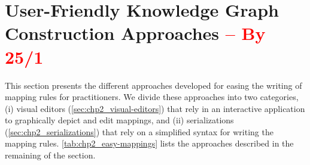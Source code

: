 \section{User-Friendly Knowledge Graph Construction Approaches \textcolor{red}{-- By 25/1}}
\label{sec:chp2_easy_kgc}

This section presents the different approaches developed for easing the writing of mapping rules for practitioners. We divide these approaches into two categories, (i) visual editors (\cref{sec:chp2_visual-editors}) that rely in an interactive application to graphically depict and edit mappings, and (ii) serializations (\cref{sec:chp2_serializations}) that rely on a simplified syntax for writing the mapping rules. \cref{tab:chp2_easy-mappings} lists the approaches described in the remaining of the section.

